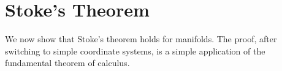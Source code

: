 

\section{Stoke's Theorem}

We now show that Stoke's theorem holds for manifolds. The proof, after switching to simple coordinate systems, is a simple application of the fundamental theorem of calculus.

